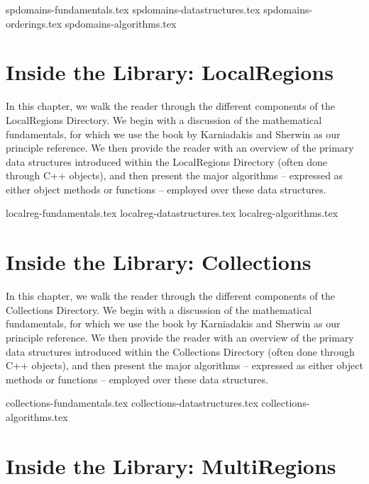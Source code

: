 {spdomains-fundamentals.tex}
%
{spdomains-datastructures.tex}
%
{spdomains-orderings.tex}
%
{spdomains-algorithms.tex}


\chapter{Inside the Library: LocalRegions}
\label{chap:localregions}


In this chapter, we walk the reader through the different components
of the LocalRegions Directory.  We begin with a discussion of the
mathematical fundamentals, for which we use the book by Karniadakis
and Sherwin \cite{KaSh05} as our principle reference.  We then provide
the reader with an overview of the primary data structures introduced
within the LocalRegions Directory (often done through C++ objects),
and then present the major algorithms -- expressed as either object
methods or functions -- employed over these data structures.

{localreg-fundamentals.tex}
%
{localreg-datastructures.tex}
%
{localreg-algorithms.tex}


\chapter{Inside the Library: Collections}

In this chapter, we walk the reader through the different components
of the Collections Directory.  We begin with a discussion of the
mathematical fundamentals, for which we use the book by Karniadakis
and Sherwin \cite{KaSh05} as our principle reference.  We then provide
the reader with an overview of the primary data structures introduced
within the Collections Directory (often done through C++ objects), and
then present the major algorithms -- expressed as either object
methods or functions -- employed over these data structures.

{collections-fundamentals.tex}
%
{collections-datastructures.tex}
%
{collections-algorithms.tex}


\chapter{Inside the Library: MultiRegions}
\label{chap:multiregions}


